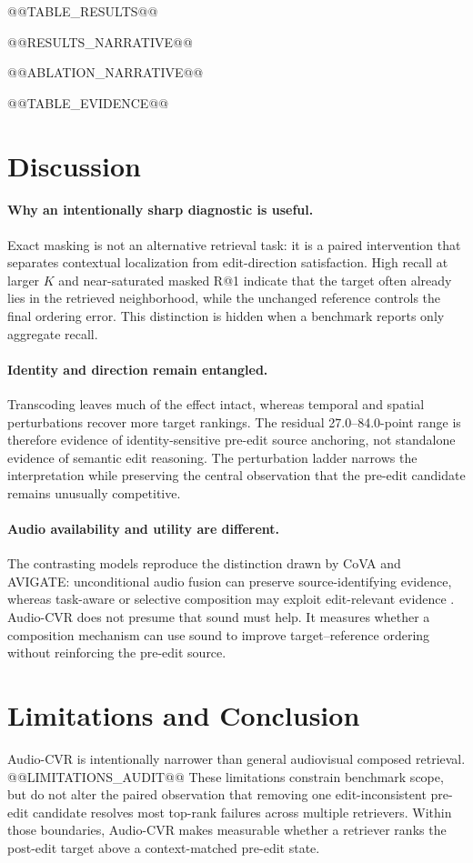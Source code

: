 \documentclass[letterpaper]{article}
\begin{document}
@@TABLE_RESULTS@@

@@RESULTS_NARRATIVE@@

@@ABLATION_NARRATIVE@@

@@TABLE_EVIDENCE@@

\section{Discussion}

\paragraph{Why an intentionally sharp diagnostic is useful.}
Exact masking is not an alternative retrieval task: it is a paired intervention that separates contextual localization from edit-direction satisfaction.
High recall at larger $K$ and near-saturated masked R@1 indicate that the target often already lies in the retrieved neighborhood, while the unchanged reference controls the final ordering error.
This distinction is hidden when a benchmark reports only aggregate recall.

\paragraph{Identity and direction remain entangled.}
Transcoding leaves much of the effect intact, whereas temporal and spatial perturbations recover more target rankings.
The residual 27.0--84.0-point range is therefore evidence of identity-sensitive pre-edit source anchoring, not standalone evidence of semantic edit reasoning.
The perturbation ladder narrows the interpretation while preserving the central observation that the pre-edit candidate remains unusually competitive.

\paragraph{Audio availability and utility are different.}
The contrasting models reproduce the distinction drawn by CoVA and AVIGATE: unconditional audio fusion can preserve source-identifying evidence, whereas task-aware or selective composition may exploit edit-relevant evidence \cite{han2026cova,jeong2025avigate}.
Audio-CVR does not presume that sound must help.
It measures whether a composition mechanism can use sound to improve target--reference ordering without reinforcing the pre-edit source.

\section{Limitations and Conclusion}

Audio-CVR is intentionally narrower than general audiovisual composed retrieval.
@@LIMITATIONS_AUDIT@@
These limitations constrain benchmark scope, but do not alter the paired observation that removing one edit-inconsistent pre-edit candidate resolves most top-rank failures across multiple retrievers.
Within those boundaries, Audio-CVR makes measurable whether a retriever ranks the post-edit target above a context-matched pre-edit state.


\end{document}
